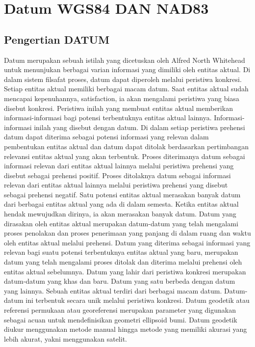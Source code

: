 \section{Datum WGS84 DAN NAD83}
\subsection{Pengertian DATUM}

Datum merupakan sebuah istilah yang dicetuskan oleh Alfred North Whitehead untuk menunjukan berbagai varian informasi yang dimiliki oleh entitas aktual. Di dalam sistem filsafat proses, datum dapat diperoleh melalui peristiwa konkresi. Setiap entitas aktual memiliki berbagai macam datum. Saat entitas aktual sudah mencapai kepenuhannya, satisfaction, ia akan mengalami peristiwa yang biasa disebut konkresi. Peristiwa inilah yang membuat entitas aktual memberikan informasi-informasi bagi potensi terbentuknya entitas aktual lainnya. Informasi-informasi inilah yang disebut dengan datum. Di dalam setiap peristiwa prehensi datum dapat diterima sebagai potensi informasi yang relevan dalam pembentukan entitas aktual dan datum dapat ditolak berdasarkan pertimbangan relevansi entitas aktual yang akan terbentuk. Proses diterimanya datum sebagai informasi relevan dari entitas aktual lainnya melalui peristiwa prehensi yang disebut sebagai prehensi positif. Proses ditolaknya datum sebagai informasi relevan dari entitas aktual lainnya melalui peristiwa prehensi yang disebut sebagai prehensi negatif.
Satu potensi entitas aktual merasakan banyak datum dari berbagai entitas aktual yang ada di dalam semesta. Ketika entitas aktual hendak mewujudkan dirinya, ia akan merasakan banyak datum. Datum yang dirasakan oleh entitas aktual merupakan datum-datum yang telah mengalami proses penolakan dan proses penerimaan yang panjang di dalam ruang dan waktu oleh entitas aktual melalui prehensi. Datum yang diterima sebagai informasi yang relevan bagi suatu potensi terbentuknya entitas aktual yang baru, merupakan datum yang telah mengalami proses ditolak dan diterima melalui prehensi oleh entitas aktual sebelumnya. Datum yang lahir dari peristiwa konkresi merupakan datum-datum yang khas dan baru. Datum yang satu berbeda dengan datum yang lainnya. Sebuah entitas aktual terdiri dari berbagai macam datum. Datum-datum ini terbentuk secara unik melalui peristiwa konkresi.
Datum geodetik atau referensi permukaan atau georeferensi merupakan parameter yang digunakan sebagai acuan untuk mendefinisikan geometri ellipsoid bumi. Datum geodetik diukur menggunakan metode manual hingga metode yang memiliki akurasi yang lebih akurat, yakni menggunakan satelit.

